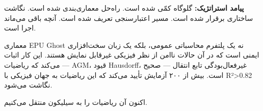\documentclass[12pt, a4paper]{article}
\begin{document}
\textbf{پیامد استراتژیک:} گلوگاه کمّی شده است. راه‌حل معماری‌بندی شده است. نگاشت ساختاری برقرار شده است. مسیر اعتبارسنجی تعریف شده است. آنچه باقی می‌ماند اجرا است.

معماری EPU Ghost نه یک پلتفرم محاسباتی عمومی، بلکه یک زبان سخت‌افزاری ایمنی است که در آن حالات ناامن از نظر فیزیکی غیرقابل نمایش هستند. این کار اثبات می‌کند که ریاضیات — AGM، قیود Hausdorff، غیرفعال‌بودگی تابع انتقال — صحیح است. بیش از ۲۰۰ آزمایش تأیید می‌کند که این ریاضیات به جهان فیزیکی با R²>0.82 نگاشت می‌شود.

اکنون آن ریاضیات را به سیلیکون منتقل می‌کنیم.

\end{document}

